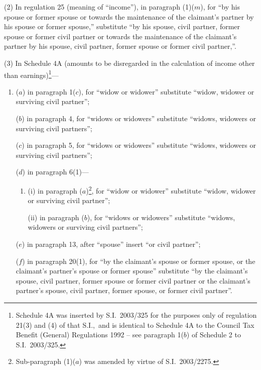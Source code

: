 \documentclass[12pt,a4paper]{article}
\begin{document}
(2) In regulation 25 (meaning of “income”), in paragraph (1)($m$), for “by his spouse or former spouse or towards the maintenance of the claimant’s partner by his spouse or former spouse,” substitute “by his spouse, civil partner, former spouse or former civil partner or towards the maintenance of the claimant’s partner by his spouse, civil partner, former spouse or former civil partner,”.

(3) In Schedule 4A (amounts to be disregarded in the calculation of income other than earnings)\footnote{Schedule 4A was inserted by S.I.\ 2003/325 for the purposes only of regulation 21(3) and (4) of that S.I.,\ and is identical to Schedule 4A to the Council Tax Benefit (General) Regulations 1992 – see paragraph 1($b$) of Schedule 2 to S.I.\ 2003/325.}—
\begin{enumerate}\item[]
($a$) in paragraph 1($c$), for “widow or widower” substitute “widow, widower or surviving civil partner”;

($b$) in paragraph 4, for “widows or widowers” substitute “widows, widowers or surviving civil partners”;

($c$) in paragraph 5, for “widows or widowers” substitute “widows, widowers or surviving civil partners”;

($d$) in paragraph 6(1)—
\begin{enumerate}\item[]
(i) in paragraph ($a$)\footnote{Sub-paragraph (1)($a$) was amended by virtue of S.I.\ 2003/2275.}, for “widow or widower” substitute “widow, widower or surviving civil partner”;

(ii) in paragraph ($b$), for “widows or widowers” substitute “widows, widowers or surviving civil partners”;
\end{enumerate}

($e$) in paragraph 13, after “spouse” insert “or civil partner”;

($f$) in paragraph 20(1), for “by the claimant’s spouse or former spouse, or the claimant’s partner’s spouse or former spouse” substitute “by the claimant’s spouse, civil partner, former spouse or former civil partner or the claimant’s partner’s spouse, civil partner, former spouse, or former civil partner”.
\end{enumerate}
\end{document}
